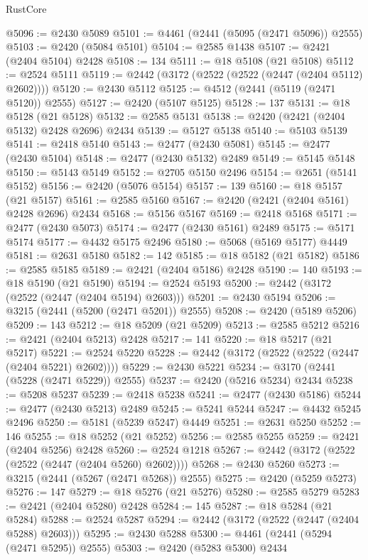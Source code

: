 \begin{lexlean}{RustCore}
\begin{coremodule}
@5096 := @2430 @5089
@5101 := @4461 (@2441 (@5095 (@2471 @5096)) @2555)
@5103 := @2420 (@5084 @5101)
@5104 := @2585 @1438
@5107 := @2421 (@2404 @5104) @2428
@5108 := 134
@5111 := @18 @5108 (@21 @5108)
@5112 := @2524 @5111
@5119 := @2442 (@3172 (@2522 (@2522 (@2447 (@2404 @5112) @2602))))
@5120 := @2430 @5112
@5125 := @4512 (@2441 (@5119 (@2471 @5120)) @2555)
@5127 := @2420 (@5107 @5125)
@5128 := 137
@5131 := @18 @5128 (@21 @5128)
@5132 := @2585 @5131
@5138 := @2420 (@2421 (@2404 @5132) @2428 @2696) @2434
@5139 := @5127 @5138
@5140 := @5103 @5139
@5141 := @2418 @5140
@5143 := @2477 (@2430 @5081)
@5145 := @2477 (@2430 @5104)
@5148 := @2477 (@2430 @5132) @2489
@5149 := @5145 @5148
@5150 := @5143 @5149
@5152 := @2705 @5150 @2496
@5154 := @2651 (@5141 @5152)
@5156 := @2420 (@5076 @5154)
@5157 := 139
@5160 := @18 @5157 (@21 @5157)
@5161 := @2585 @5160
@5167 := @2420 (@2421 (@2404 @5161) @2428 @2696) @2434
@5168 := @5156 @5167
@5169 := @2418 @5168
@5171 := @2477 (@2430 @5073)
@5174 := @2477 (@2430 @5161) @2489
@5175 := @5171 @5174
@5177 := @4432 @5175 @2496
@5180 := @5068 (@5169 @5177) @4449
@5181 := @2631 @5180
@5182 := 142
@5185 := @18 @5182 (@21 @5182)
@5186 := @2585 @5185
@5189 := @2421 (@2404 @5186) @2428
@5190 := 140
@5193 := @18 @5190 (@21 @5190)
@5194 := @2524 @5193
@5200 := @2442 (@3172 (@2522 (@2447 (@2404 @5194) @2603)))
@5201 := @2430 @5194
@5206 := @3215 (@2441 (@5200 (@2471 @5201)) @2555)
@5208 := @2420 (@5189 @5206)
@5209 := 143
@5212 := @18 @5209 (@21 @5209)
@5213 := @2585 @5212
@5216 := @2421 (@2404 @5213) @2428
@5217 := 141
@5220 := @18 @5217 (@21 @5217)
@5221 := @2524 @5220
@5228 := @2442 (@3172 (@2522 (@2522 (@2447 (@2404 @5221) @2602))))
@5229 := @2430 @5221
@5234 := @3170 (@2441 (@5228 (@2471 @5229)) @2555)
@5237 := @2420 (@5216 @5234) @2434
@5238 := @5208 @5237
@5239 := @2418 @5238
@5241 := @2477 (@2430 @5186)
@5244 := @2477 (@2430 @5213) @2489
@5245 := @5241 @5244
@5247 := @4432 @5245 @2496
@5250 := @5181 (@5239 @5247) @4449
@5251 := @2631 @5250
@5252 := 146
@5255 := @18 @5252 (@21 @5252)
@5256 := @2585 @5255
@5259 := @2421 (@2404 @5256) @2428
@5260 := @2524 @1218
@5267 := @2442 (@3172 (@2522 (@2522 (@2447 (@2404 @5260) @2602))))
@5268 := @2430 @5260
@5273 := @3215 (@2441 (@5267 (@2471 @5268)) @2555)
@5275 := @2420 (@5259 @5273)
@5276 := 147
@5279 := @18 @5276 (@21 @5276)
@5280 := @2585 @5279
@5283 := @2421 (@2404 @5280) @2428
@5284 := 145
@5287 := @18 @5284 (@21 @5284)
@5288 := @2524 @5287
@5294 := @2442 (@3172 (@2522 (@2447 (@2404 @5288) @2603)))
@5295 := @2430 @5288
@5300 := @4461 (@2441 (@5294 (@2471 @5295)) @2555)
@5303 := @2420 (@5283 @5300) @2434

\end{coremodule}
\end{lexlean}
